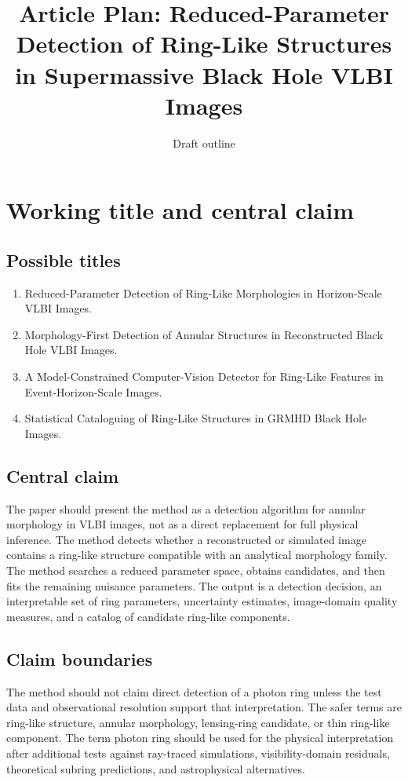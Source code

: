 \documentclass[11pt]{article}
\title{Article Plan: Reduced-Parameter Detection of Ring-Like Structures in Supermassive Black Hole VLBI Images}
\author{Draft outline}
\date{}
\begin{document}
\maketitle
\tableofcontents

\section{Working title and central claim}

\subsection{Possible titles}
\begin{enumerate}[leftmargin=*]
    \item Reduced-Parameter Detection of Ring-Like Morphologies in Horizon-Scale VLBI Images.
    \item Morphology-First Detection of Annular Structures in Reconstructed Black Hole VLBI Images.
    \item A Model-Constrained Computer-Vision Detector for Ring-Like Features in Event-Horizon-Scale Images.
    \item Statistical Cataloguing of Ring-Like Structures in GRMHD Black Hole Images.
\end{enumerate}

\subsection{Central claim}
The paper should present the method as a detection algorithm for annular morphology in VLBI images, not as a direct replacement for full physical inference. The method detects whether a reconstructed or simulated image contains a ring-like structure compatible with an analytical morphology family. The method searches a reduced parameter space, obtains candidates, and then fits the remaining nuisance parameters. The output is a detection decision, an interpretable set of ring parameters, uncertainty estimates, image-domain quality measures, and a catalog of candidate ring-like components.

\subsection{Claim boundaries}
The method should not claim direct detection of a photon ring unless the test data and observational resolution support that interpretation. The safer terms are ring-like structure, annular morphology, lensing-ring candidate, or thin ring-like component. The term photon ring should be used for the physical interpretation after additional tests against ray-traced simulations, visibility-domain residuals, theoretical subring predictions, and astrophysical alternatives.
\end{document}
